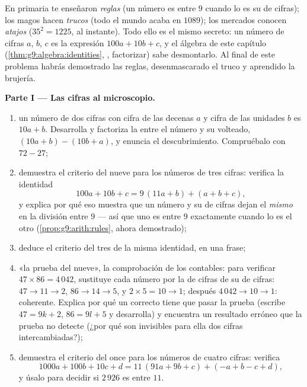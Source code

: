 \begin{problem}
\label{pb:g9:algebra:1}
En primaria te enseñaron \emph{reglas} (un número es  entre
$9$ cuando lo es su  de cifras); los magos hacen \emph{trucos}
(todo el mundo acaba en $1089$); los mercados conocen \emph{atajos}
($35^2 = 1225$, al instante). Todo ello es el mismo secreto: un
número de cifras $a$, $b$, $c$ es la expresión
$100a + 10b + c$, y el álgebra de este capítulo
(\cref{thm:g9:algebra:identities}, , factorizar) sabe
desmontarlo. Al final de este problema habrás demostrado las
reglas, desenmascarado el truco y aprendido la brujería.

\medskip
\noindent\textbf{Parte I --- Las cifras al microscopio.}
\begin{enumerate}
  \item un número de dos cifras con cifra de las decenas $a$ y cifra de las unidades
        $b$ es $10a + b$. Desarrolla y factoriza la 
        entre el número y su volteado,
        $(10a + b) - (10b + a)$, y enuncia el descubrimiento. Compruébalo
        con $72 - 27$;
  \item demuestra el criterio del nueve para los números de tres cifras: verifica
        la identidad
        \[
        100a + 10b + c = 9\,(11a + b) + (a + b + c),
        \]
        y explica por qué eso muestra que un número y su  de cifras
        dejan el \emph{mismo } en la división entre $9$
        --- así que uno es  entre $9$ exactamente cuando lo es el otro
        (\cref{prop:g9:arith:rules}, ahora demostrado);
  \item deduce el criterio del tres de la misma identidad, en una
        frase;
  \item «la prueba del nueve», la comprobación de los contables: para verificar
        $47 \times 86 = 4\,042$, sustituye cada número por la
         de cifras de su  de cifras: $47 \to 11 \to 2$,
        $86 \to 14 \to 5$, y $2 \times 5 = 10 \to 1$; después
        $4\,042 \to 10 \to 1$: coherente. Explica por qué un
         correcto tiene que pasar la prueba (escribe $47 = 9k + 2$,
        $86 = 9l + 5$ y desarrolla) y encuentra un resultado erróneo que
        la prueba no detecte (¿por qué son invisibles para ella dos cifras
        intercambiadas?);
  \item demuestra el criterio del once para los números de cuatro cifras: verifica
        \[
        1000a + 100b + 10c + d
        = 11\,(91a + 9b + c) + (- a + b - c + d),
        \]
        y úsalo para decidir si $2\,926$ es  entre
        $11$.
\end{enumerate}


\end{problem}
